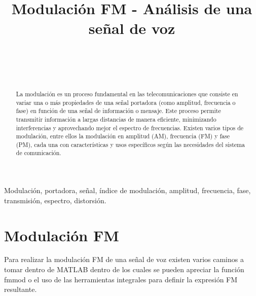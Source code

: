 \documentclass[conference]{IEEEtran}
\begin{document}
	
	\title{Modulación FM - Análisis de una señal de voz}
	\author{
		\\
		\\
		\\
		\and
		\and
		\and
	}
	
	\maketitle
	\begin{abstract}
		La modulación es un proceso fundamental en las telecomunicaciones que consiste en variar una o más propiedades de una señal portadora (como amplitud, frecuencia o fase) en función de una señal de información o mensaje. Este proceso permite transmitir información a largas distancias de manera eficiente, minimizando interferencias y aprovechando mejor el espectro de frecuencias. Existen varios tipos de modulación, entre ellos la modulación en amplitud (AM), frecuencia (FM) y fase (PM), cada una con características y usos específicos según las necesidades del sistema de comunicación.
		
	\end{abstract}
	
	\begin{IEEEkeywords}
		Modulación, portadora, señal, índice de modulación, amplitud, frecuencia, fase, transmisión, espectro, distorsión.
	\end{IEEEkeywords}
	
	
	\section{ Modulación FM }
	Para realizar la modulación FM de una señal de voz existen varios caminos a tomar dentro de MATLAB dentro de los cuales se pueden apreciar la función fmmod o el uso de las herramientas integrales para definir la expresión FM resultante.
	
\end{document}
